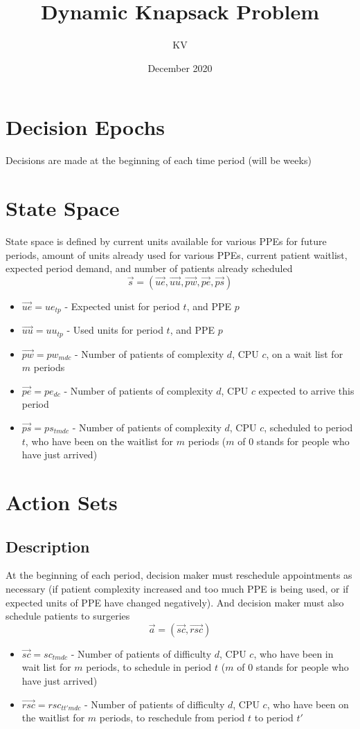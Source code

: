 \documentclass{article}
\title{Dynamic Knapsack Problem}
\author{KV}
\date{December 2020}
\begin{document}
\maketitle

\section{Decision Epochs}
Decisions are made at the beginning of each time period (will be weeks)

\section{State Space}
State space is defined by current units available for various PPEs for future periods, amount of units already used for various PPEs, current patient waitlist, expected period demand, and number of patients already scheduled
\[ \vec{s}  = (\vec{ue}, \vec{uu}, \vec{pw}, \vec{pe}, \vec{ps})\]
\begin{itemize}
    \item $\vec{ue} = ue_{tp}$ - Expected unist for period $t$, and PPE $p$
    \item $\vec{uu} = uu_{tp}$ - Used units for period $t$, and PPE $p$
    \item $\vec{pw} = pw_{mdc}$ - Number of patients of complexity $d$, CPU $c$, on a wait list for $m$ periods
    \item $\vec{pe} = pe_{dc}$ - Number of patients of complexity $d$, CPU $c$ expected to arrive this period
    \item $\vec{ps} = ps_{tmdc}$ - Number of patients of complexity $d$, CPU $c$, scheduled to period $t$, who have been on the waitlist for $m$ periods ($m$ of 0 stands for people who have just arrived)
\end{itemize}

\section{Action Sets}

\subsection{Description}
At the beginning of each period, decision maker must reschedule appointments as necessary (if patient complexity increased and too much PPE is being used, or if expected units of PPE have changed negatively). And decision maker must also schedule patients to surgeries
\[ \vec{a} = (\vec{sc}, \vec{rsc}) \]
\begin{itemize}
    \item $\vec{sc} = sc_{tmdc}$ - Number of patients of difficulty $d$, CPU $c$, who have been in wait list for $m$ periods, to schedule in period $t$ ($m$ of 0 stands for people who have just arrived)
	\item $\vec{rsc} = rsc_{tt'mdc}$ - Number of patients of difficulty $d$, CPU $c$, who have been on the waitlist for $m$ periods, to reschedule from period $t$ to period $t'$
\end{itemize}
\end{document}
